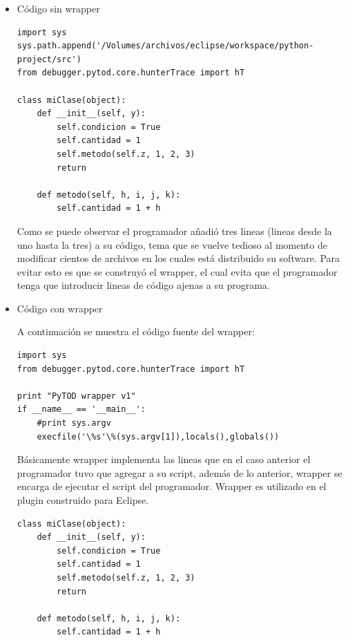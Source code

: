 \documentclass[12pt,legalpaper]{report}
\begin{document}
\begin{itemize}
	\item Código sin wrapper
\begin{singlespace}
\begin{lstlisting}[style=Python]
import sys
sys.path.append('/Volumes/archivos/eclipse/workspace/python-project/src')
from debugger.pytod.core.hunterTrace import hT

class miClase(object):
    def __init__(self, y):
        self.condicion = True
        self.cantidad = 1
        self.metodo(self.z, 1, 2, 3)
        return
    
    def metodo(self, h, i, j, k):
        self.cantidad = 1 + h
\end{lstlisting}
\end{singlespace}

Como se puede observar el programador añadió tres lineas (lineas desde la uno hasta la tres) a su código, tema que se vuelve tedioso al momento de modificar cientos de archivos en los cuales está distribuido su software.  Para evitar esto es que se construyó el wrapper, el cual evita que el programador tenga que introducir lineas de código ajenas a su programa.  

	\item Código con wrapper

A continuación se muestra el código fuente del wrapper:
	
\begin{singlespace}
\begin{lstlisting}[style=Python]
import sys
from debugger.pytod.core.hunterTrace import hT

print "PyTOD wrapper v1"
if __name__ == '__main__':
    #print sys.argv
    execfile('\%s'\%(sys.argv[1]),locals(),globals())
\end{lstlisting}
\end{singlespace}

Básicamente wrapper implementa las lineas que en el caso anterior el programador tuvo que agregar a su script, además de lo anterior, wrapper se encarga de ejecutar el script del programador.  Wrapper es utilizado en el plugin construido para Eclipse.

\begin{singlespace}
\begin{lstlisting}[style=Python]
class miClase(object):
    def __init__(self, y):
        self.condicion = True
        self.cantidad = 1
        self.metodo(self.z, 1, 2, 3)
        return
    
    def metodo(self, h, i, j, k):
        self.cantidad = 1 + h       
\end{lstlisting}
\end{singlespace}
\end{itemize}
\end{document}
